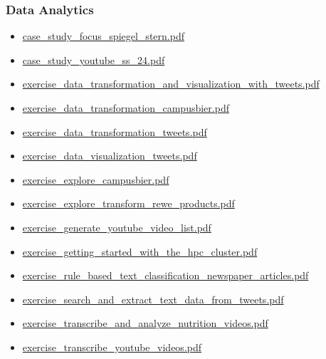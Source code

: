 \documentclass[
  letterpaper,
  DIV=11]{scrartcl}
\providecommand{\tightlist}{%
  \setlength{\itemsep}{0pt}\setlength{\parskip}{0pt}}\usepackage{longtable,booktabs,array}
\begin{document}
\subsubsection{Data Analytics}\label{data-analytics}

\begin{itemize}
\tightlist
\item
  \href{quarto/data_analytics/case_study_focus_spiegel_stern.pdf}{case\_study\_focus\_spiegel\_stern.pdf}
\item
  \href{quarto/data_analytics/case_study_youtube_ss_24.pdf}{case\_study\_youtube\_ss\_24.pdf}
\item
  \href{quarto/data_analytics/exercise_data_transformation_and_visualization_with_tweets.pdf}{exercise\_data\_transformation\_and\_visualization\_with\_tweets.pdf}
\item
  \href{quarto/data_analytics/exercise_data_transformation_campusbier.pdf}{exercise\_data\_transformation\_campusbier.pdf}
\item
  \href{quarto/data_analytics/exercise_data_transformation_tweets.pdf}{exercise\_data\_transformation\_tweets.pdf}
\item
  \href{quarto/data_analytics/exercise_data_visualization_tweets.pdf}{exercise\_data\_visualization\_tweets.pdf}
\item
  \href{quarto/data_analytics/exercise_explore_campusbier.pdf}{exercise\_explore\_campusbier.pdf}
\item
  \href{quarto/data_analytics/exercise_explore_transform_rewe_products.pdf}{exercise\_explore\_transform\_rewe\_products.pdf}
\item
  \href{quarto/data_analytics/exercise_generate_youtube_video_list.pdf}{exercise\_generate\_youtube\_video\_list.pdf}
\item
  \href{quarto/data_analytics/exercise_getting_started_with_the_hpc_cluster.pdf}{exercise\_getting\_started\_with\_the\_hpc\_cluster.pdf}
\item
  \href{quarto/data_analytics/exercise_rule_based_text_classification_newspaper_articles.pdf}{exercise\_rule\_based\_text\_classification\_newspaper\_articles.pdf}
\item
  \href{quarto/data_analytics/exercise_search_and_extract_text_data_from_tweets.pdf}{exercise\_search\_and\_extract\_text\_data\_from\_tweets.pdf}
\item
  \href{quarto/data_analytics/exercise_transcribe_and_analyze_nutrition_videos.pdf}{exercise\_transcribe\_and\_analyze\_nutrition\_videos.pdf}
\item
  \href{quarto/data_analytics/exercise_transcribe_youtube_videos.pdf}{exercise\_transcribe\_youtube\_videos.pdf}
\end{itemize}
\end{document}
